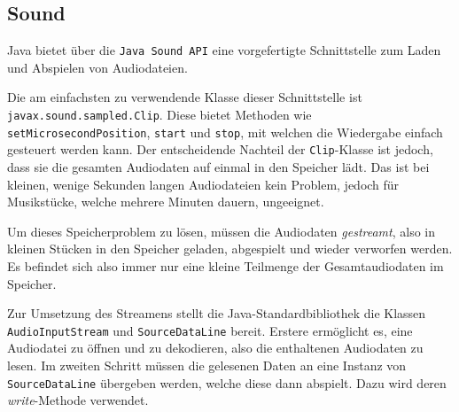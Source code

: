 \subsection{Sound}

\begin{sloppypar}
Java bietet über die \texttt{Java Sound API} eine vorgefertigte Schnittstelle zum Laden und Abspielen von Audiodateien.
\par Die am einfachsten zu verwendende Klasse dieser Schnittstelle ist
\texttt{javax.sound.sampled.Clip}. Diese bietet Methoden wie \texttt{setMicrosecondPosition}, \texttt{start} und \texttt{stop}, mit
welchen die Wiedergabe einfach gesteuert werden kann. Der entscheidende
Nachteil der \texttt{Clip}-Klasse ist jedoch, dass sie die gesamten Audiodaten auf einmal in den Speicher lädt. Das ist bei kleinen, wenige Sekunden langen Audiodateien kein Problem, jedoch für Musikstücke, welche mehrere Minuten dauern, ungeeignet. 
\par Um dieses Speicherproblem zu lösen, müssen die Audiodaten \textit{gestreamt},
also in kleinen Stücken in den Speicher geladen, abgespielt und wieder
verworfen werden. Es befindet sich also immer nur eine kleine Teilmenge der Gesamtaudiodaten im Speicher.
\par Zur Umsetzung des Streamens stellt die Java-Standardbibliothek die Klassen \texttt{AudioInputStream} und \texttt{SourceDataLine} bereit. Erstere ermöglicht es, eine Audiodatei zu öffnen und zu
dekodieren, also die enthaltenen Audiodaten zu lesen. Im zweiten
Schritt müssen die gelesenen Daten an eine Instanz von \texttt{SourceDataLine} übergeben werden, welche diese dann abspielt. Dazu wird deren \textit{write}-Methode verwendet.
\end{sloppypar}
